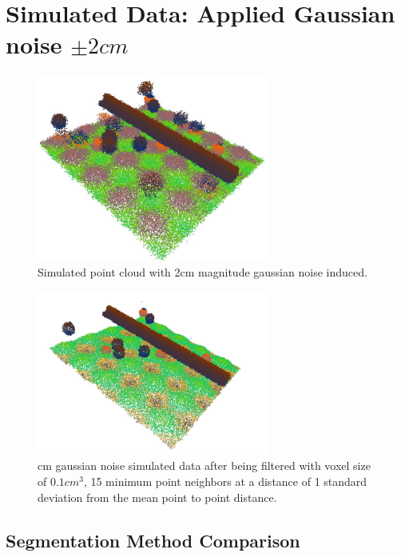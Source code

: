 \documentclass[12pt]{drexelthesis}
\let\Oldsection\section
\renewcommand{\section}{\FloatBarrier\Oldsection}
\let\Oldsubsection\subsection
\renewcommand{\subsection}{\FloatBarrier\Oldsubsection}
\begin{document}
\section{Simulated Data: Applied Gaussian noise $\pm 2 cm$}
\begin{figure}[!h]
	\label{2cmnoise:raw}
	\centering
		\includegraphics[width=3in]{simulated-lab-scan/2cmnoise/rawcloud.jpg}
		\caption[Simulated point cloud with 2cm magnitude gaussian noise induced]{\centering  Simulated point cloud with 2cm magnitude gaussian noise induced.}
\end{figure}

\begin{figure}[!h]
	\label{2cmnoise:filtered}
	\centering
		\includegraphics[width=3in]{simulated-lab-scan/2cmnoise/DS01k15std1.jpg}
		\caption[2 cm gaussian noise simulated data after being filtered with voxel size of 0.1 $cm^{3}$, 15 minimum point neighbors at a distance of 1 standard deviation from the mean point to point distance]{ cm gaussian noise simulated data after being filtered with voxel size of $0.1 cm^{3}$, 15 minimum point neighbors at a distance of 1 standard deviation from the mean point to point distance.}
\end{figure}

\subsection{Segmentation Method Comparison}
\end{document}
